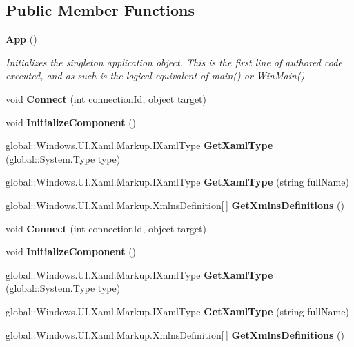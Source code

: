 \subsection*{Public Member Functions}
\begin{DoxyCompactItemize}
\item 
{\bf App} ()
\begin{DoxyCompactList}\small\item\em Initializes the singleton application object. This is the first line of authored code executed, and as such is the logical equivalent of main() or Win\+Main(). \end{DoxyCompactList}\item 
void {\bfseries Connect} (int connection\+Id, object target)\label{class_bundle_test_app_1_1_app_a0a5635d86e70a262031ceba6403a0f09}

\item 
void {\bfseries Initialize\+Component} ()\label{class_bundle_test_app_1_1_app_aa68b4e421fa0219b98819c91082d7885}

\item 
global\+::\+Windows.\+U\+I.\+Xaml.\+Markup.\+I\+Xaml\+Type {\bfseries Get\+Xaml\+Type} (global\+::\+System.\+Type type)\label{class_bundle_test_app_1_1_app_a2ce321b9da23883ba14f16b34da5169f}

\item 
global\+::\+Windows.\+U\+I.\+Xaml.\+Markup.\+I\+Xaml\+Type {\bfseries Get\+Xaml\+Type} (string full\+Name)\label{class_bundle_test_app_1_1_app_aa412ded48806f9e13662001548cd7c3d}

\item 
global\+::\+Windows.\+U\+I.\+Xaml.\+Markup.\+Xmlns\+Definition[$\,$] {\bfseries Get\+Xmlns\+Definitions} ()\label{class_bundle_test_app_1_1_app_a510e2dd8e2de1264eed6f3f35fcbd3be}

\item 
void {\bfseries Connect} (int connection\+Id, object target)\label{class_bundle_test_app_1_1_app_a0a5635d86e70a262031ceba6403a0f09}

\item 
void {\bfseries Initialize\+Component} ()\label{class_bundle_test_app_1_1_app_aa68b4e421fa0219b98819c91082d7885}

\item 
global\+::\+Windows.\+U\+I.\+Xaml.\+Markup.\+I\+Xaml\+Type {\bfseries Get\+Xaml\+Type} (global\+::\+System.\+Type type)\label{class_bundle_test_app_1_1_app_a2ce321b9da23883ba14f16b34da5169f}

\item 
global\+::\+Windows.\+U\+I.\+Xaml.\+Markup.\+I\+Xaml\+Type {\bfseries Get\+Xaml\+Type} (string full\+Name)\label{class_bundle_test_app_1_1_app_aa412ded48806f9e13662001548cd7c3d}

\item 
global\+::\+Windows.\+U\+I.\+Xaml.\+Markup.\+Xmlns\+Definition[$\,$] {\bfseries Get\+Xmlns\+Definitions} ()\label{class_bundle_test_app_1_1_app_a510e2dd8e2de1264eed6f3f35fcbd3be}

\end{DoxyCompactItemize}
